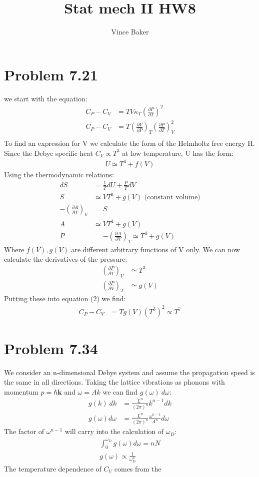 \documentclass[a4paper,11pt]{article}
\title{Stat mech II HW8}
\author{Vince Baker}
\numberwithin{equation}{section}
\newcommand{\bv}[1]{\mathbf{#1}}
\begin{document}
\maketitle

\section{Problem 7.21}
we start with the equation:
\begin{align}
 C_P-C_V &= TV\kappa_T\left(\frac{\partial P}{\partial T} \right)^2\\
 C_P-C_V &= T\left(\frac{\partial V}{\partial P}\right)_T\left(\frac{\partial P}{\partial T} \right)_V^2\\
\end{align}
To find an expression for V we calculate the form of the Helmholtz free energy H.
Since the Debye specific heat $C_V \propto T^3$ at low temperature, U has the form:
\begin{align}
 U \simeq T^4+f(V)
\end{align}
Using the thermodynamic relations:
\begin{align}
 dS &= \frac{1}{T}dU + \frac{P}{T}dV\\
 S &\simeq  VT^3+g(V)\text{ (constant volume)}\\
 -\left(\frac{\partial A}{\partial T} \right)_V &= S\\
 A &\simeq VT^4+g(V)\\
 P &= -\left(\frac{\partial A}{\partial V} \right)_T \simeq T^4+g(V)
\end{align}
Where $f(V),g(V)$ are different arbitrary functions of V only. 
We can now calculate the derivatives of the pressure:
\begin{align}
 \left(\frac{\partial P}{\partial T} \right)_V &\simeq  T^3\\
 \left(\frac{\partial P}{\partial V} \right)_T &\simeq  g(V)
\end{align}
Putting these into equation (2) we find:
\begin{align}
 C_P-C_V &= Tg(V)(T^3)^2 \propto T^7
\end{align}

\section{Problem 7.34}
We consider an n-dimensional Debye system and assume the propagation speed is the same in all directions.
Taking the lattice vibrations as phonons with momentum $p=\hbar\bv{k}$ and $\omega=Ak$ we can find $g(\omega)\ d\omega$:
\begin{align}
 g(k)\ dk &= \frac{L^n}{(2\pi)^n} k^{n-1} dk\\
 g(\omega) d\omega &= \frac{L^n}{(2\pi)^n} \frac{\omega^{n-1}}{A^n}  d\omega
\end{align}
The factor of $\omega^{n-1}$ will carry into the calculation of $\omega_{D}$:
\begin{align}
 \int_0^{\omega_D}g(\omega)d\omega = nN\\
 g(\omega) \propto \frac{1}{\omega_D^n}
\end{align}
The temperature dependence of $C_V$ comes from the 
\end{document}
